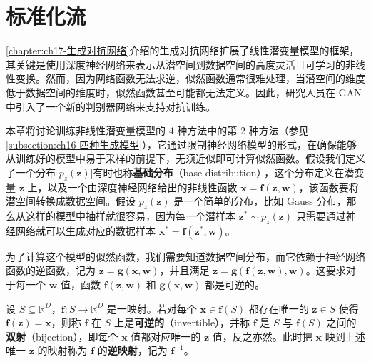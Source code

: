\documentclass[../main.tex]{subfiles}
\begin{document}
\chapter{标准化流}\label{chapter:ch18-标准化流}

\cref{chapter:ch17-生成对抗网络}介绍的生成对抗网络扩展了线性潜变量模型的框架，其关键是使用深度神经网络来表示从潜空间到数据空间的高度灵活且可学习的非线性变换。然而，因为网络函数无法求逆，似然函数通常很难处理，当潜空间的维度低于数据空间的维度时，似然函数甚至可能都无法定义。因此，研究人员在 GAN 中引入了一个新的判别器网络来支持对抗训练。

本章将讨论训练非线性潜变量模型的 $4$ 种方法中的第 $2$ 种方法（参见\cref{subsection:ch16-四种生成模型}），它通过限制神经网络模型的形式，在确保能够从训练好的模型中易于采样的前提下，无须近似即可计算似然函数。假设我们定义了一个分布 $p_z(\bm{z})$[有时也称\textbf{基础分布}（base distribution）]，这个分布定义在潜变量 $\bm{z}$ 上，以及一个由深度神经网络给出的非线性函数 $\bm{x}=\bm{f}(\bm{z},\bm{w})$，该函数要将潜空间转换成数据空间。假设 $p_z(\bm{z})$ 是一个简单的分布，比如 Gauss 分布，那么从这样的模型中抽样就很容易，因为每一个潜样本 $\bm{z}^{*}\sim p_z(\bm{z})$ 只需要通过神经网络就可以生成对应的数据样本 $\bm{x}^{*}=\bm{f}(\bm{z}^{*},\bm{w})$。

为了计算这个模型的似然函数，我们需要知道数据空间分布，而它依赖于神经网络函数的逆函数，记为 $\bm{z}=\bm{g}(\bm{x},\bm{w})$，并且满足 $\bm{z}=\bm{g}(\bm{f}(\bm{z},\bm{w}),\bm{w})$。这要求对于每一个 $\bm{w}$ 值，函数 $\bm{f}(\bm{z},\bm{w})$ 和 $\bm{g}(\bm{x},\bm{w})$ 都是可逆的。

\begin{definition}[可逆映射与双射]\label{definition:ch18-双射}
设 $S\subseteq\mathbb{R}^{D}$，$\bm{f}:S\rightarrow\mathbb{R}^{D}$ 是一映射。若对每个 $\bm{x}\in\bm{f}(S)$ 都存在唯一的 $\bm{z}\in S$ 使得 $\bm{f}(\bm{z})=\bm{x}$，则称 $\bm{f}$ 在 $S$ 上是\textbf{可逆的}（invertible），并称 $\bm{f}$ 是 $S$ 与 $\bm{f}(S)$ 之间的\textbf{双射}（bijection），即每个 $\bm{x}$ 值都对应唯一的 $\bm{z}$ 值，反之亦然。此时把 $\bm{x}$ 映到上述唯一 $\bm{z}$ 的映射称为 $\bm{f}$ 的\textbf{逆映射}，记为 $\bm{f}^{-1}$。
\end{definition}
\end{document}
